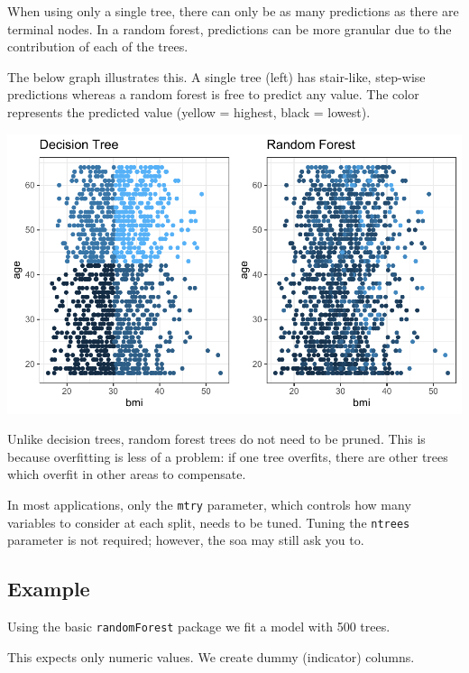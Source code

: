 \documentclass[openany]{book}
\begin{document}
When using only a single tree, there can only be as many predictions as there are terminal nodes. In a random forest, predictions can be more granular due to the contribution of each of the trees.

The below graph illustrates this. A single tree (left) has stair-like, step-wise predictions whereas a random forest is free to predict any value. The color represents the predicted value (yellow = highest, black = lowest).

\includegraphics{06-tree-based-models_files/figure-latex/unnamed-chunk-11-1.pdf}

Unlike decision trees, random forest trees do not need to be pruned. This is because overfitting is less of a problem: if one tree overfits, there are other trees which overfit in other areas to compensate.

In most applications, only the \texttt{mtry} parameter, which controls how many variables to consider at each split, needs to be tuned. Tuning the \texttt{ntrees} parameter is not required; however, the soa may still ask you to.

\hypertarget{example-3}{%
\subsection{Example}\label{example-3}}

Using the basic \texttt{randomForest} package we fit a model with 500 trees.

This expects only numeric values. We create dummy (indicator) columns.
\end{document}
